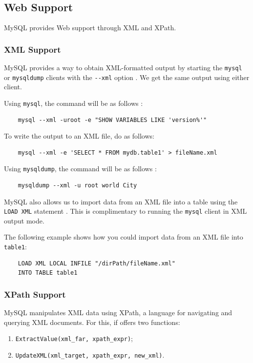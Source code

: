 \documentclass[12pt]{article}
\newcounter{subsubsubsection}[subsubsection]
\begin{document}
\subsection{Web Support}
\label{webSupport}
MySQL provides Web support through XML and XPath.


\subsubsection{XML Support}
\label{xmlSupport}
\label{exportXml}
MySQL provides a way to obtain XML-formatted output by starting the \verb|mysql| or \verb|mysqldump| clients with the \verb|--xml| option \parencite{XMLFunctions}. We get the same output using either client.

\vspace{0.3cm}

\noindent Using \verb|mysql|, the command will be as follows \parencite{xmlmysqlOption}:
\begin{verbatim}
    mysql --xml -uroot -e "SHOW VARIABLES LIKE 'version%'"
\end{verbatim}

\vspace{0.3cm}

\noindent To write the output to an XML file, do as follows:
\begin{verbatim}
    mysql --xml -e 'SELECT * FROM mydb.table1' > fileName.xml
\end{verbatim}

\noindent Using \verb|mysqldump|, the command will be as follows \parencite{xmlmysqldumpOption}:
\begin{verbatim}
    mysqldump --xml -u root world City
\end{verbatim}

\label{importXml}
MySQL also allows us to import data from an XML file into a table using the \verb|LOAD XML| statement \parencite{loadXMLStatement}. This is complimentary to running the \verb|mysql| client in XML output mode. 

The following example shows how you could import data from an XML file into \verb|table1|:
\begin{verbatim}
    LOAD XML LOCAL INFILE "/dirPath/fileName.xml"
    INTO TABLE table1
\end{verbatim}


\subsubsection{XPath Support}
\label{xpathSupport}
MySQL manipulates XML data using XPath, a language for navigating and querying XML documents. For this, if offers two functions:
\begin{enumerate}
    \item \verb|ExtractValue(xml_far, xpath_expr)|;
    
    \item \verb|UpdateXML(xml_target, xpath_expr, new_xml)|.
\end{enumerate}
\end{document}
